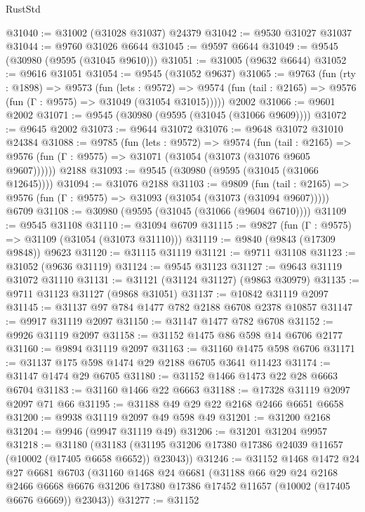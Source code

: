 \begin{lexlean}{RustStd}
\begin{coremodule}
@31040 := @31002 (@31028 @31037) @24379
@31042 := @9530 @31027 @31037
@31044 := @9760 @31026 @6644
@31045 := @9597 @6644
@31049 := @9545 (@30980 (@9595 (@31045 @9610)))
@31051 := @31005 (@9632 @6644)
@31052 := @9616 @31051
@31054 := @9545 (@31052 @9637)
@31065 := @9763
    (fun (rty : @1898) =>
    @9573
      (fun (lets : @9572) =>
      @9574 (fun (tail : @2165) => @9576 (fun (Γ : @9575) => @31049 (@31054 @31015)))))
    @2002
@31066 := @9601 @2002
@31071 := @9545 (@30980 (@9595 (@31045 (@31066 @9609))))
@31072 := @9645 @2002
@31073 := @9644 @31072
@31076 := @9648 @31072 @31010 @24384
@31088 := @9785
    (fun (lets : @9572) =>
    @9574
      (fun (tail : @2165) =>
      @9576 (fun (Γ : @9575) => @31071 (@31054 (@31073 (@31076 @9605 @9607))))))
    @2188
@31093 := @9545 (@30980 (@9595 (@31045 (@31066 @12645))))
@31094 := @31076 @2188
@31103 := @9809
    (fun (tail : @2165) => @9576 (fun (Γ : @9575) => @31093 (@31054 (@31073 (@31094 @9607)))))
    @6709
@31108 := @30980 (@9595 (@31045 (@31066 (@9604 @6710))))
@31109 := @9545 @31108
@31110 := @31094 @6709
@31115 := @9827 (fun (Γ : @9575) => @31109 (@31054 (@31073 @31110)))
@31119 := @9840 (@9843 (@17309 @9848)) @9623
@31120 := @31115 @31119
@31121 := @9711 @31108
@31123 := @31052 (@9636 @31119)
@31124 := @9545 @31123
@31127 := @9643 @31119 @31072 @31110
@31131 := @31121 (@31124 @31127) (@9863 @30979)
@31135 := @9711 @31123 @31127 (@9868 @31051)
@31137 := @10842 @31119 @2097
@31145 := @31137 @97 @784 @1477 @782 @2188 @6708 @2378 @10857
@31147 := @9917 @31119 @2097
@31150 := @31147 @1477 @782 @6708
@31152 := @9926 @31119 @2097
@31158 := @31152 @1475 @86 @598 @14 @6706 @2177
@31160 := @9894 @31119 @2097
@31163 := @31160 @1475 @598 @6706
@31171 := @31137 @175 @598 @1474 @29 @2188 @6705 @3641 @11423
@31174 := @31147 @1474 @29 @6705
@31180 := @31152 @1466 @1473 @22 @28 @6663 @6704
@31183 := @31160 @1466 @22 @6663
@31188 := @17328 @31119 @2097 @2097 @71 @66
@31195 := @31188 @49 @29 @22 @2168 @2466 @6651 @6658
@31200 := @9938 @31119 @2097 @49 @598 @49
@31201 := @31200 @2168
@31204 := @9946 (@9947 @31119 @49)
@31206 := @31201 @31204 @9957
@31218 := @31180
    (@31183 (@31195 @31206 @17380 @17386 @24039 @11657 (@10002 (@17405 @6658 @6652)) @23043))
@31246 := @31152
    @1468
    @1472
    @24
    @27
    @6681
    @6703
    (@31160
      @1468
      @24
      @6681
      (@31188
        @66
        @29
        @24
        @2168
        @2466
        @6668
        @6676
        @31206
        @17380
        @17386
        @17452
        @11657
        (@10002 (@17405 @6676 @6669))
        @23043))
@31277 := @31152

\end{coremodule}
\end{lexlean}
